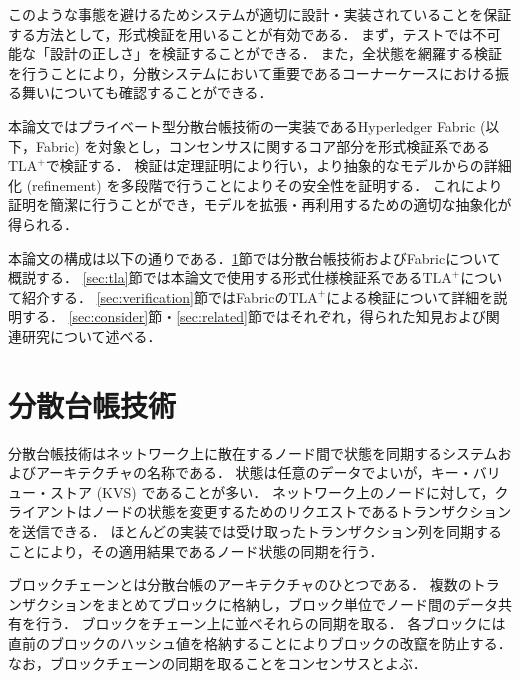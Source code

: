 \documentclass{fose2019}           %
\newcommand{\TLA}{$\text{TLA}^{+}$}
\begin{document}
このような事態を避けるためシステムが適切に設計・実装されていることを保証する方法として，形式検証を用いることが有効である．
まず，テストでは不可能な「設計の正しさ」を検証することができる．
また，全状態を網羅する検証を行うことにより，分散システムにおいて重要であるコーナーケースにおける振る舞いについても確認することができる．

本論文ではプライベート型分散台帳技術の一実装であるHyperledger Fabric (以下，Fabric) を対象とし，コンセンサスに関するコア部分を形式検証系である\TLA で検証する．
検証は定理証明により行い，より抽象的なモデルからの詳細化 (refinement) を多段階で行うことによりその安全性を証明する．
これにより証明を簡潔に行うことができ，モデルを拡張・再利用するための適切な抽象化が得られる．

本論文の構成は以下の通りである．\ref{sec:dlt}節では分散台帳技術およびFabricについて概説する．
\ref{sec:tla}節では本論文で使用する形式仕様検証系である\TLA について紹介する．
\ref{sec:verification}節ではFabricの\TLA による検証について詳細を説明する．
\ref{sec:consider}節・\ref{sec:related}節ではそれぞれ，得られた知見および関連研究について述べる．

\section{分散台帳技術}\label{sec:dlt}
分散台帳技術はネットワーク上に散在するノード間で状態を同期するシステムおよびアーキテクチャの名称である．
状態は任意のデータでよいが，キー・バリュー・ストア (KVS) であることが多い．
ネットワーク上のノードに対して，クライアントはノードの状態を変更するためのリクエストであるトランザクションを送信できる．
ほとんどの実装では受け取ったトランザクション列を同期することにより，その適用結果であるノード状態の同期を行う．

ブロックチェーンとは分散台帳のアーキテクチャのひとつである．
複数のトランザクションをまとめてブロックに格納し，ブロック単位でノード間のデータ共有を行う．
ブロックをチェーン上に並べそれらの同期を取る．
各ブロックには直前のブロックのハッシュ値を格納することによりブロックの改竄を防止する．
なお，ブロックチェーンの同期を取ることをコンセンサスとよぶ．
\end{document}
